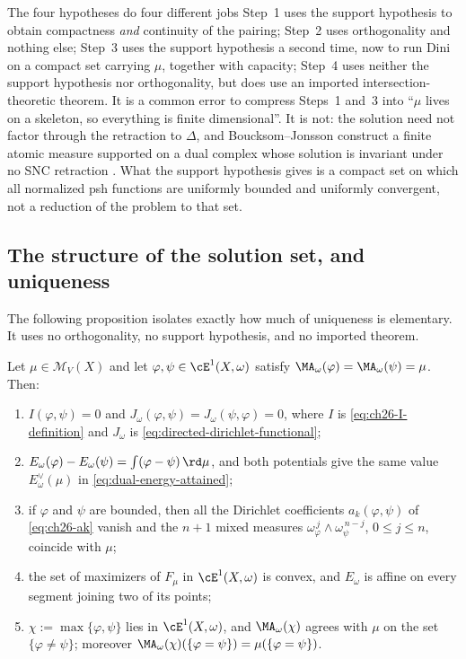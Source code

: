 \begin{warning}{The four hypotheses do four different jobs}
Step~1 uses the support hypothesis to obtain compactness \emph{and}
continuity of the pairing; Step~2 uses orthogonality and nothing else;
Step~3 uses the support hypothesis a second time, now to run Dini on a
compact set carrying $\mu$, together with capacity; Step~4 uses neither
the support hypothesis nor orthogonality, but does use an imported
intersection-theoretic theorem.  It is a common error to compress Steps~1
and~3 into ``$\mu$ lives on a skeleton, so everything is finite
dimensional''.  It is not: the solution need not factor through the
retraction to $\Delta$, and Boucksom--Jonsson construct a finite atomic
measure supported on a dual complex whose solution is invariant under no
SNC retraction \cite[Theorem~B]{BJGreen24}.  What the support hypothesis
gives is a compact set on which all normalized psh functions are uniformly
bounded and uniformly convergent, not a reduction of the problem to that
set.
\end{warning}

\subsection{The structure of the solution set, and uniqueness}
\label{sec:ch28-uniqueness}

The following proposition isolates exactly how much of uniqueness is
elementary.  It uses no orthogonality, no support hypothesis, and no
imported theorem.

\begin{proposition}
\label{prop:ch28-solution-set}
Let $\mu\in\mathcal M_V(X)$ and let
$\varphi,\psi\in\cE^1(X,\omega)$ satisfy
$\MA_\omega(\varphi)=\MA_\omega(\psi)=\mu$.  Then:
\begin{enumerate}
\item\label{itm:ch28-sol:I}
 $I(\varphi,\psi)=0$ and $J_\omega(\varphi,\psi)=
 J_\omega(\psi,\varphi)=0$, where $I$ is
 \eqref{eq:ch26-I-definition} and $J_\omega$ is
 \eqref{eq:directed-dirichlet-functional};
\item\label{itm:ch28-sol:energy}
 $E_\omega(\varphi)-E_\omega(\psi)=\int(\varphi-\psi)\,\rd\mu$, and both
 potentials give the same value $E^\vee_\omega(\mu)$ in
 \eqref{eq:dual-energy-attained};
\item\label{itm:ch28-sol:mixed}
 if $\varphi$ and $\psi$ are bounded, then all the Dirichlet
 coefficients $a_k(\varphi,\psi)$ of \eqref{eq:ch26-ak} vanish and the
 $n+1$ mixed measures
 $\omega_\varphi^{\,j}\wedge\omega_\psi^{\,n-j}$, $0\leq j\leq n$,
 coincide with $\mu$;
\item\label{itm:ch28-sol:convex}
 the set of maximizers of $F_\mu$ in $\cE^1(X,\omega)$ is convex, and
 $E_\omega$ is affine on every segment joining two of its points;
\item\label{itm:ch28-sol:max}
 $\chi:=\max\{\varphi,\psi\}$ lies in $\cE^1(X,\omega)$, and
 $\MA_\omega(\chi)$ agrees with $\mu$ on the set
 $\{\varphi\neq\psi\}$; moreover
 $\MA_\omega(\chi)(\{\varphi=\psi\})=\mu(\{\varphi=\psi\})$.
\end{enumerate}
\end{proposition}

